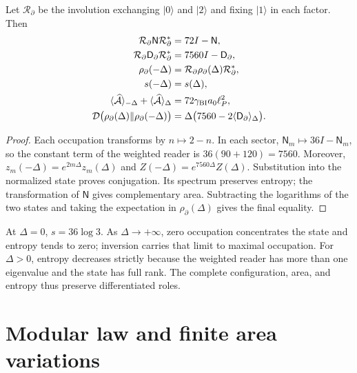 \begin{theorem}
\label{x_reciprocidad:vii:thm:inversion-sectorial}
Let \(\mathcal R_\partial\) be the involution exchanging
\(|0\rangle\) and \(|2\rangle\) and fixing \(|1\rangle\) in each
factor. Then
\begin{align}
 \mathcal R_\partial\mathsf N\mathcal R_\partial^*&=72I-\mathsf N,\\
 \mathcal R_\partial\mathsf D_\partial\mathcal R_\partial^*
 &=7560I-\mathsf D_\partial,\\
 \rho_\partial(-\Delta)&=\mathcal R_\partial\rho_\partial(\Delta)
                          \mathcal R_\partial^*,\\
 s(-\Delta)&=s(\Delta),\\
 \langle\widehat{\mathcal A}\rangle_{-\Delta}
 +\langle\widehat{\mathcal A}\rangle_\Delta
 &=72\gamma_{\rm BI}a_0\ell_P^2,\\
 \mathcal D\bigl(\rho_\partial(\Delta)\Vert\rho_\partial(-\Delta)\bigr)
 &=\Delta\bigl(7560-2\langle\mathsf D_\partial\rangle_\Delta\bigr).
 \label{x_reciprocidad:vii:eq:inversion-sectorial}
\end{align}
\end{theorem}
\begin{proof}
Each occupation transforms by \(n\mapsto2-n\). In each sector,
\(\mathsf N_m\mapsto36I-\mathsf N_m\), so the constant
term of the weighted reader is \(36(90+120)=7560\).
Moreover, \(z_m(-\Delta)=e^{2m\Delta}z_m(\Delta)\) and
\(Z(-\Delta)=e^{7560\Delta}Z(\Delta)\). Substitution into the
normalized state proves conjugation. Its spectrum preserves entropy;
the transformation of \(\mathsf N\) gives complementary area. Subtracting
the logarithms of the two states and taking the expectation in
\(\rho_\partial(\Delta)\) gives the final equality.
\end{proof}

At \(\Delta=0\), \(s=36\log3\). As \(\Delta\to+\infty\),
zero occupation concentrates the state and entropy tends to zero;
inversion carries that limit to maximal occupation. For \(\Delta>0\),
entropy decreases strictly because the weighted reader has more
than one eigenvalue and the state has full rank. The complete configuration,
area, and entropy thus preserve differentiated roles.

\section{Modular law and finite area variations}
\label{x_reciprocidad:vii:subsec:ley-modular-finita}

